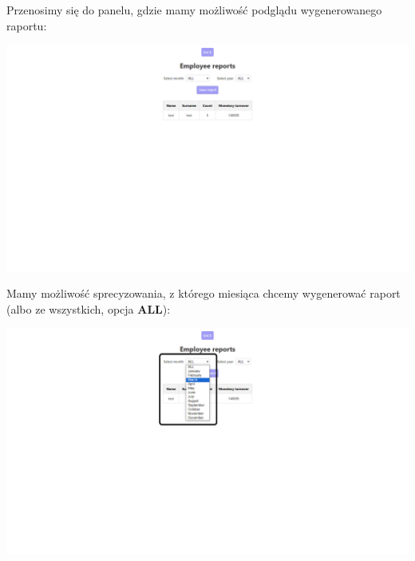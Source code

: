 \documentclass[12pt]{article}
\begin{document}
\begin{minipage}{\textwidth}
\noindent Przenosimy się do panelu, gdzie mamy możliwość podglądu wygenerowanego raportu:
\begin{center}
\includegraphics[width=\textwidth]{media/Report_in.png}
\end{center}
\end{minipage}

\begin{minipage}{\textwidth}
\noindent Mamy możliwość sprecyzowania, z którego miesiąca chcemy wygenerować raport (albo ze wszystkich, opcja \textbf{ALL}):
\begin{center}
\includegraphics[width=\textwidth]{media/Report_month.png}
\end{center}
\end{minipage}
\end{document}
